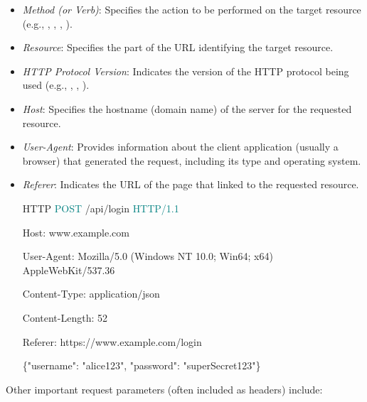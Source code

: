 \begin{itemize}
    \item \textit{Method (or Verb)}: Specifies the action to be performed on the target resource (e.g., , , , ).
    \item \textit{Resource}: Specifies the part of the URL identifying the target resource.
    \item \textit{HTTP Protocol Version}: Indicates the version of the HTTP protocol being used (e.g., , , ).
    \item \textit{Host}: Specifies the hostname (domain name) of the server for the requested resource.
    \item \textit{User-Agent}: Provides information about the client application (usually a browser) that generated the request, including its type and operating system.
    \item \textit{Referer}: Indicates the URL of the page that linked to the requested resource.

          \begin{customcode}{HTTP}
              \textcolor{teal}{POST} /api/login \textcolor{teal}{HTTP/1.1}

              \textcolor{RedOrange}{Host}: www.example.com

              \textcolor{RedOrange}{User-Agent}: Mozilla/5.0 (Windows NT 10.0; Win64; x64) AppleWebKit/537.36

              \textcolor{RedOrange}{Content-Type}: application/json

              \textcolor{RedOrange}{Content-Length}: 52

              \textcolor{RedOrange}{Referer}: https://www.example.com/login

              \vspace{2\baselineskip}

              \{"username": "alice123", "password": "superSecret123"\}
          \end{customcode}
\end{itemize}

Other important request parameters (often included as headers) include:

